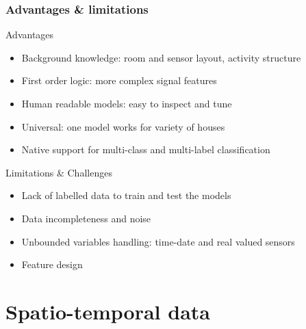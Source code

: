 \documentclass[10pt]{beamer}
\begin{document}
\begin{frame}
  \frametitle{Advantages \& limitations}
  \begin{block}{Advantages}
  \begin{itemize}
    \item Background knowledge: room and sensor layout, activity structure
    \item First order logic: more complex signal features
    \item Human readable models: easy to inspect and tune
    \item Universal: one model works for variety of houses
    \item Native support for multi-class and multi-label classification
  \end{itemize}
  \end{block}

  \begin{block}{Limitations \& Challenges}
    \begin{itemize}
      \item Lack of labelled data to train and test the models
      \item Data incompleteness and noise
      \item Unbounded variables handling: time-date and real valued sensors
      \item Feature design
    \end{itemize}
  \end{block}

\end{frame}


\section{Spatio-temporal data}
\end{document}
